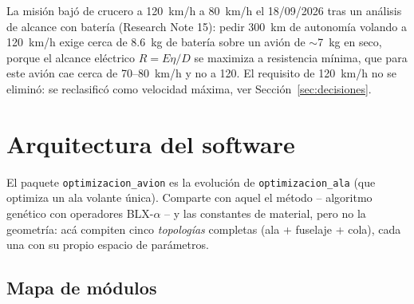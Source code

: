 \documentclass[11pt,a4paper]{article}
\begin{document}
La misión bajó de crucero a 120~km/h a 80~km/h el 18/09/2026 tras un análisis de alcance con batería (Research Note 15): pedir 300~km de autonomía volando a 120~km/h exige cerca de 8.6~kg de batería sobre un avión de $\sim$7~kg en seco, porque el alcance eléctrico $R = E\eta/D$ se maximiza a resistencia mínima, que para este avión cae cerca de 70--80~km/h y no a 120. El requisito de 120~km/h no se eliminó: se reclasificó como velocidad máxima, ver Sección~\ref{sec:decisiones}.

\section{Arquitectura del software}

El paquete \texttt{optimizacion\_avion} es la evolución de \texttt{optimizacion\_ala} (que optimiza un ala volante única). Comparte con aquel el método -- algoritmo genético con operadores BLX-$\alpha$ -- y las constantes de material, pero no la geometría: acá compiten cinco \emph{topologías} completas (ala + fuselaje + cola), cada una con su propio espacio de parámetros.

\subsection{Mapa de módulos}
\end{document}
